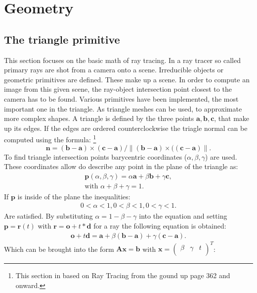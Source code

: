 \section{Geometry}
\subsection{The triangle primitive}
This section focuses on the basic math of ray tracing. In a ray tracer so called primary rays are shot from a camera
onto a scene. Irreducible objects or geometric primitives are defined. These make up a scene. In order to compute an
image from this given scene, the ray-object intersection point closest to the camera has to be found. 
Various primitives have been implemented, the most important one in the triangle. As triangle meshes can be used, to
approximate more complex shapes. A triangle is defined by the three points $\mathbf{a},\mathbf{b},\mathbf{c}$, that make up its edges. If the edges are ordered counterclockwise the triagle normal can be computed using the formula:
\footnote{This section in based on Ray Tracing from the gound up page 362 and onward.}
\begin{equation}
\mathbf{n} = (\mathbf{b} - \mathbf{a}) \times (\mathbf{c} - \mathbf{a}) /
 \|( \mathbf{b} - \mathbf{a} ) \times ((\mathbf{c} - \mathbf{a})\|.
\label{eq:triNormal}
\end{equation}
To find triangle intersection points barycentric coordinates ($\alpha, \beta, \gamma$) are used. These coordinates allow do describe any point in the plane of the triangle as:
\begin{align}
\mathbf{p}(\alpha,\beta,\gamma) = \alpha \mathbf{a} + \beta \mathbf{b} + \gamma \mathbf{c}, \\
\text{with } \alpha + \beta + \gamma = 1.
\end{align}
If $\mathbf{p}$ is inside of the plane the inequalities:
\begin{align}
0 < \alpha < 1,
0 < \beta < 1,
0 < \gamma < 1.
\label{ineq:inCond}
\end{align}
Are satisfied. By substituting $\alpha = 1 - \beta - \gamma$ into the equation and setting $\mathbf{p} = \mathbf{r}(t)$ with $\mathbf{r} = \mathbf{o} + t * \mathbf{d}$ for a ray the following equation is obtained:
\begin{align}
\mathbf{o} + t\mathbf{d} = \mathbf{a} + \beta(\mathbf{b} - \mathbf{a}) + \gamma (\mathbf{c} - \mathbf{a}).
\end{align}
Which can be brought into the form $\mathbf{A}\mathbf{x} = \mathbf{b}$ with $\mathbf{x} = \begin{pmatrix}
\beta & \gamma & t \\
\end{pmatrix}^T$:

